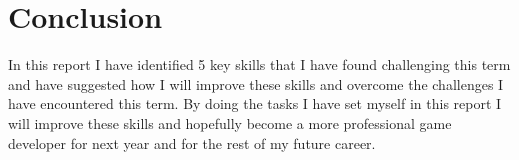 \documentclass{scrartcl}
\begin{document}
\section*{Conclusion}
In this report I have identified 5 key skills that I have found challenging this term and have suggested how I will improve these skills and overcome the challenges I have encountered this term. By doing the tasks I have set myself in this report I will improve these skills and hopefully become a more professional game developer for next year and for the rest of my future career.



\end{document}
